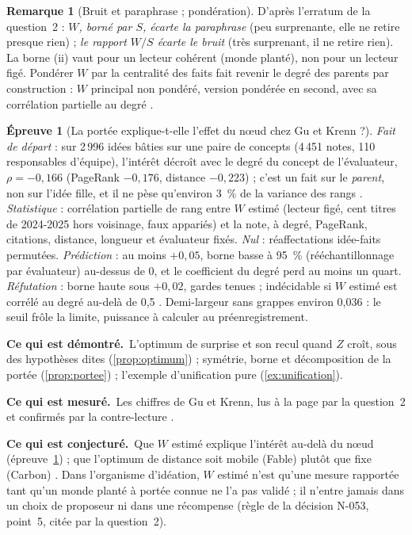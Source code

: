 \documentclass[11pt,a4paper]{article}
\theoremstyle{definition}
\newtheorem{remarque}[definition]{Remarque}
\newtheorem{test}[definition]{Épreuve}
\theoremstyle{plain}
\newcommand{\demontre}{\par\noindent\textbf{Ce qui est démontré.}~}
\newcommand{\mesure}{\par\smallskip\noindent\textbf{Ce qui est mesuré.}~}
\newcommand{\conjecture}{\par\smallskip\noindent\textbf{Ce qui est conjecturé.}~}
\begin{document}
\begin{remarque}[Bruit et paraphrase ; pondération]
D'après l'erratum de la question~2 \cite{erratamineurs} : \emph{$W$, borné par $S$, écarte la
paraphrase} (peu surprenante, elle ne retire presque rien) ; \emph{le rapport $W/S$ écarte le bruit}
(très surprenant, il ne retire rien). La borne (ii) vaut pour un lecteur cohérent (monde planté),
non pour un lecteur figé. Pondérer $W$ par la centralité des faits fait revenir le degré des parents
par construction : $W$ principal non pondéré, version pondérée en second, avec sa corrélation
partielle au degré \cite[section~2]{q2}.
\end{remarque}

\begin{test}[La portée explique-t-elle l'effet du nœud chez Gu et Krenn ?]
\label{test:gukrenn}
\emph{Fait de départ} : sur 2\,996 idées bâties sur une paire de concepts (4\,451 notes, 110
responsables d'équipe), l'intérêt décroît avec le degré du concept de l'évaluateur,
$\rho=-0{,}166$ (PageRank $-0{,}176$, distance $-0{,}223$) \cite[v4, p.~8]{gukrenn2026} ; c'est un
fait sur le \emph{parent}, non sur l'idée fille, et il ne pèse qu'environ 3~\% de la variance des
rangs \cite[section~1]{q2}. \emph{Statistique} : corrélation partielle de rang entre $W$ estimé
(lecteur figé, cent titres de 2024-2025 hors voisinage, faux appariés) et la note, à degré,
PageRank, citations, distance, longueur et évaluateur fixés. \emph{Nul} : réaffectations
idée-faits permutées. \emph{Prédiction} : au moins $+0{,}05$, borne basse à 95~\% (rééchantillonnage
par évaluateur) au-dessus de 0, et le coefficient du degré perd au moins un quart. \emph{Réfutation} :
borne haute sous $+0{,}02$, gardes tenues ; indécidable si $W$ estimé est corrélé au degré au-delà
de 0,5 \cite[section~6]{q2}. Demi-largeur sans grappes environ 0,036 : le seuil frôle la limite,
puissance à calculer au préenregistrement.
\end{test}

\begin{statuts}
\demontre L'optimum de surprise et son recul quand $Z$ croît, sous des hypothèses dites
(\ref{prop:optimum}) ; symétrie, borne et décomposition de la portée (\ref{prop:portee}) ;
l'exemple d'unification pure (\ref{ex:unification}).
\mesure Les chiffres de Gu et Krenn, lus à la page par la question~2 et confirmés par la
contre-lecture \cite[section~Q2]{contrelecture}.
\conjecture Que $W$ estimé explique l'intérêt au-delà du nœud (épreuve~\ref{test:gukrenn}) ; que
l'optimum de distance soit mobile (Fable) plutôt que fixe (Carbon) \cite[section~4]{q7}.
Dans l'organisme d'idéation, $W$ estimé n'est qu'une mesure rapportée tant qu'un monde planté à
portée connue ne l'a pas validé ; il n'entre jamais dans un choix de proposeur ni dans une
récompense (règle de la décision N-053, point~5, citée par la question~2).
\end{statuts}
\end{document}
